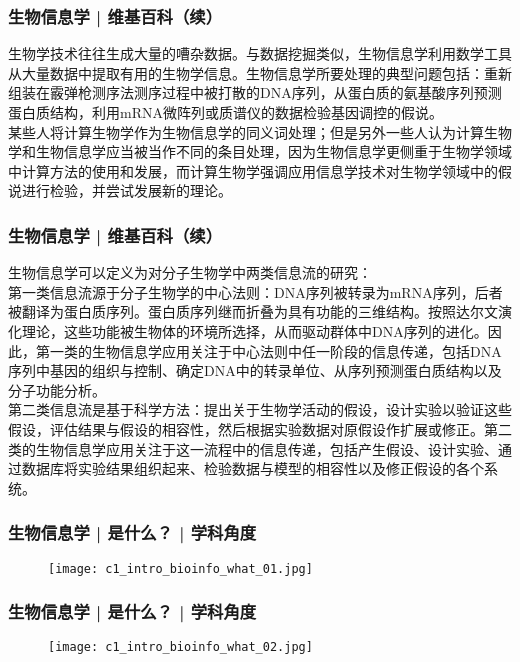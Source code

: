 \begin{frame}
  \frametitle{生物信息学 | 维基百科（续）}
生物学技术往往生成大量的嘈杂数据。与数据挖掘类似，生物信息学利用数学工具从大量数据中提取有用的生物学信息。生物信息学所要处理的典型问题包括：重新组装在霰弹枪测序法测序过程中被打散的DNA序列，从蛋白质的氨基酸序列预测蛋白质结构，利用mRNA微阵列或质谱仪的数据检验基因调控的假说。\\
  \vspace{1em}
某些人将计算生物学作为生物信息学的同义词处理；但是另外一些人认为计算生物学和生物信息学应当被当作不同的条目处理，因为生物信息学更侧重于生物学领域中计算方法的使用和发展，而计算生物学强调应用信息学技术对生物学领域中的假说进行检验，并尝试发展新的理论。
\end{frame}

\begin{frame}
  \frametitle{生物信息学 | 维基百科（续）}
  生物信息学可以定义为对分子生物学中两类信息流的研究：\\
  \vspace{1em}
第一类信息流源于分子生物学的中心法则：DNA序列被转录为mRNA序列，后者被翻译为蛋白质序列。蛋白质序列继而折叠为具有功能的三维结构。按照达尔文演化理论，这些功能被生物体的环境所选择，从而驱动群体中DNA序列的进化。因此，第一类的生物信息学应用关注于中心法则中任一阶段的信息传递，包括DNA序列中基因的组织与控制、确定DNA中的转录单位、从序列预测蛋白质结构以及分子功能分析。\\
  \vspace{1em}
第二类信息流是基于科学方法：提出关于生物学活动的假设，设计实验以验证这些假设，评估结果与假设的相容性，然后根据实验数据对原假设作扩展或修正。第二类的生物信息学应用关注于这一流程中的信息传递，包括产生假设、设计实验、通过数据库将实验结果组织起来、检验数据与模型的相容性以及修正假设的各个系统。
\end{frame}

\begin{frame}
  \frametitle{生物信息学 | 是什么？ | 学科角度}
  \begin{figure}
    \centering
    \texttt{[image: c1\_intro\_bioinfo\_what\_01.jpg]}
  \end{figure}
\end{frame}

\begin{frame}
  \frametitle{生物信息学 | 是什么？ | 学科角度}
  \begin{figure}
    \centering
    \texttt{[image: c1\_intro\_bioinfo\_what\_02.jpg]}
  \end{figure}
\end{frame}

